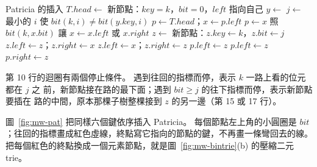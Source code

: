 \begin{pseudo}[label=alg:mw-pat-insert, unbreakable]{Patricia 的插入}
        \State $T.\mathit{head} \gets$ 新節點：$\mathit{key} = k$，$\mathit{bit} = 0$，$\mathit{left}$ 指向自己
        \State \Return
    \EndIf
    \State $y \gets$ 
        \State \Return {}
    \EndIf
    \State $j \gets$ 最小的 $i$ 使 $\mathit{bit}(k, i) \ne \mathit{bit}(y.\mathit{key}, i)$
    \State $p \gets T.\mathit{head}$；$x \gets p.\mathit{left}$
        \State $p \gets x$
        \State 照 $\mathit{bit}(k, x.\mathit{bit})$ 讓 $x \gets x.\mathit{left}$ 或 $x.\mathit{right}$
    \EndWhile
    \State $z \gets$ 新節點：$z.\mathit{key} \gets k$，$z.\mathit{bit} \gets j$
        \State $z.\mathit{left} \gets z$；$z.\mathit{right} \gets x$
    \Else
        \State $z.\mathit{left} \gets x$；$z.\mathit{right} \gets z$
    \EndIf
        \State $p.\mathit{left} \gets z$
        \State $p.\mathit{left} \gets z$
    \Else
        \State $p.\mathit{right} \gets z$
    \EndIf
\EndProcedure
\end{pseudo}

第 10 行的迴圈有兩個停止條件。 遇到往回的指標而停，表示 $k$ 一路上看的位元都在 $j$ 之
前，新節點接在路的最下面；遇到 $\mathit{bit} \ge j$ 的往下指標而停，表示新節點要插在
路的中間，原本那棵子樹整棵接到 $z$ 的另一邊（第 15 或 17 行）。

圖~\ref{fig:mw-pat} 把同樣六個鍵依序插入 Patricia。 每個節點左上角的小圓圈是
$\mathit{bit}$；往回的指標畫成紅色虛線，終點寫它指向的節點的鍵，不再畫一條彎回去的線。
把每個紅色的終點換成一個元素節點，就是圖~\ref{fig:mw-bintrie}(b) 的壓縮二元 trie。

